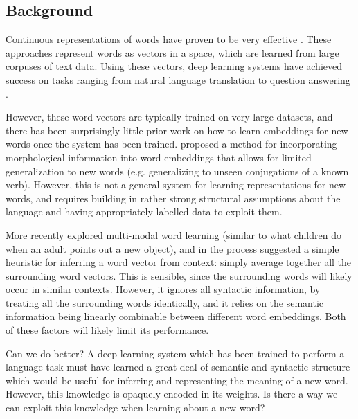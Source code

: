 \documentclass{article}
\begin{document}
\subsection{Background}
Continuous representations of words have proven to be very effective \cite[e.g.]{Mikolov2013, Pennington2014}. These approaches represent words as vectors in a space, which are learned from large corpuses of text data. Using these vectors, deep learning systems have achieved success on tasks ranging from natural language translation \cite[e.g.]{Wu2016} to question answering \cite[e.g.]{Santoro2017}. \par
However, these word vectors are typically trained on very large datasets, and there has been surprisingly little prior work on how to learn embeddings for new words once the system has been trained. \citet{Cotterell2016} proposed a method for incorporating morphological information into word embeddings that allows for limited generalization to new words (e.g. generalizing to unseen conjugations of a known verb). However, this is not a general system for learning representations for new words, and requires building in rather strong structural assumptions about the language and having appropriately labelled data to exploit them. \par
More recently \citet{Lazaridou2017} explored multi-modal word learning (similar to what children do when an adult points out a new object), and in the process suggested a simple heuristic for inferring a word vector from context: simply average together all the surrounding word vectors. This is sensible, since the surrounding words will likely occur in similar contexts. However, it ignores all syntactic information, by treating all the surrounding words identically, and it relies on the semantic information being linearly combinable between different word embeddings. Both of these factors will likely limit its performance. \par
Can we do better? A deep learning system which has been trained to perform a language task must have learned a great deal of semantic and syntactic structure which would be useful for inferring and representing the meaning of a new word. However, this knowledge is opaquely encoded in its weights. Is there a way we can exploit this knowledge when learning about a new word? \par
\end{document}
